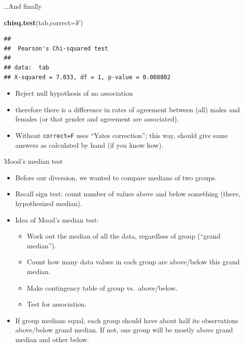 \documentclass[
  ignorenonframetext,
]{beamer}
\newenvironment{Shaded}{\begin{snugshade}}{\end{snugshade}}
\newcommand{\DataTypeTok}[1]{\textcolor[rgb]{0.13,0.29,0.53}{#1}}
\newcommand{\KeywordTok}[1]{\textcolor[rgb]{0.13,0.29,0.53}{\textbf{#1}}}
\newcommand{\NormalTok}[1]{#1}
\providecommand{\tightlist}{%
  \setlength{\itemsep}{0pt}\setlength{\parskip}{0pt}}
\begin{document}
\begin{frame}[fragile]{\ldots And finally}
\protect\hypertarget{and-finally}{}

\begin{Shaded}
\begin{Highlighting}[]
\KeywordTok{chisq.test}\NormalTok{(tab,}\DataTypeTok{correct=}\NormalTok{F)}
\end{Highlighting}
\end{Shaded}

\begin{verbatim}
## 
##  Pearson's Chi-squared test
## 
## data:  tab
## X-squared = 7.033, df = 1, p-value = 0.008002
\end{verbatim}

\begin{itemize}
\tightlist
\item
  Reject null hypothesis of no association
\item
  therefore there is a difference in rates of agreement between (all)
  males and females (or that gender and agreement are associated).
\item
  Without \texttt{correct=F} uses ``Yates correction''; this way, should
  give same answers as calculated by hand (if you know how).
\end{itemize}

\end{frame}

\begin{frame}{Mood's median test}
\protect\hypertarget{moods-median-test}{}

\begin{itemize}
\tightlist
\item
  Before our diversion, we wanted to compare medians of two groups.
\item
  Recall sign test: count number of values above and below something
  (there, hypothesized median).
\item
  Idea of Mood's median test:

  \begin{itemize}
  \tightlist
  \item
    Work out the median of all the data, regardless of group (``grand
    median'').
  \item
    Count how many data values in each group are above/below this grand
    median.
  \item
    Make contingency table of group vs.~above/below.
  \item
    Test for association.
  \end{itemize}
\item
  If group medians equal, each group should have about half its
  observations above/below grand median. If not, one group will be
  mostly above grand median and other below.
\end{itemize}

\end{frame}
\end{document}
